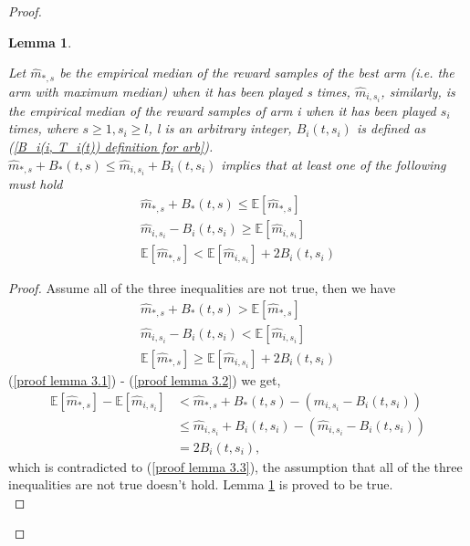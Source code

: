 \documentclass{article}
\theoremstyle{plain}
\newtheorem{lemma}{Lemma}
\begin{document}
\begin{proof}
\begin{lemma}
\label{lemma 3 normal}

Let $\hat{m}_{*, s}$ be the empirical median of the reward samples of the best arm (i.e. the arm with maximum median) when it has been played s times, $\hat{m}_{i, s_i}$, similarly, is the empirical median of the reward samples of arm i when it has been played $s_i$ times, where $s \geq 1, s_i \geq l$, l is an arbitrary integer,  $B_i(t, s_i)$ is defined as (\ref{B_i(i, T_i(t)) definition for arb}).\\

    $\hat{m}_{*, s} + B_*(t, s)  \leq \hat{m}_{i, s_i} + B_i(t, s_i)$ implies that at least one of the following must hold
    \begin{align}
        \label{lemma 3.1}
        \hat{m}_{*, s} + B_*(t, s) \leq  \mathbb{E}[\hat{m}_{*, s}]\\
        \label{lemma 3.2}
        \hat{m}_{i, s_i} - B_i(t, s_i) \geq \mathbb{E}[\hat{m}_{i, s_i}]\\
        \label{lemma 3.3}
        \mathbb{E}[\hat{m}_{*, s}] < \mathbb{E}[\hat{m}_{i, s_i}] + 2 B_i(t, s_i)
    \end{align}
\end{lemma}

\begin{proof}
Assume all of the three inequalities are not true, then we have
    \begin{align}
        \label{proof lemma 3.1}
         \hat{m}_{*, s} + B_*(t, s) >  \mathbb{E}[\hat{m}_{*, s}]\\
        \label{proof lemma 3.2}
        \hat{m}_{i, s_i} - B_i(t, s_i) < \mathbb{E}[\hat{m}_{i, s_i}]\\
        \label{proof lemma 3.3}
        \mathbb{E}[\hat{m}_{*, s}] \geq \mathbb{E}[\hat{m}_{i, s_i}] + 2 B_i(t, s_i)
    \end{align}
    (\ref{proof lemma 3.1}) - (\ref{proof lemma 3.2}) we get,
    \begin{align}
         \mathbb{E}[\hat{m}_{*, s}] - \mathbb{E}[\hat{m}_{i, s_i}] &<
         \hat{m}_{*, s} + B_*(t, s) - (\hat{m}_{i, s_i} - B_i(t, s_i)) \\
        & \leq \hat{m}_{i, s_i} + B_i(t, s_i) - (\hat{m}_{i, s_i} - B_i(t, s_i)) \\
        &= 2 B_i(t, s_i),
    \end{align}
    which is contradicted to (\ref{proof lemma 3.3}), the assumption that all of the three inequalities are not true doesn't hold. Lemma \ref{lemma 3 normal} is proved to be true.\\
\end{proof}


\end{proof}
\end{document}
